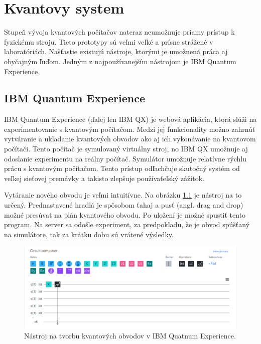 
\chapter{Kvantovy system}

Stupeň vývoja kvantových počítačov nateraz neumožnuje priamy prístup k
fyzickému stroju. Tieto prototypy sú veľmi veľké a prísne strážené v 
laboratóriách. Našťastie existujú nástroje, ktorými je umožnená práca aj 
obyčajným ľuďom. Jedným z najpoužívanejším nástrojom je IBM Quantum Experience. 

\section{IBM Quantum Experience}
IBM Quantum Experience (ďalej len IBM QX) je webová aplikácia, ktorá 
slúži na experimentovanie s kvantovým počítačom. Medzi jej funkcionality 
možno zahrnúť vytváranie a ukladanie kvantových obvodov ako aj ich 
vykonávanie na kvantovom počítači. Tento počítač je symulovaný virtuálny 
stroj, no IBM QX umožnuje aj odoslanie experimentu na reálny počítač. 
Symulátor umožnuje relatívne rýchlu prácu s kvantovým počítačom. Tento
prístup odľachčuje skutočný systém od veľkej sieťovej premávky a takisto 
zlepšuje používaťeľský zážitok.

Vytáranie nového obvodu je veľmi intuitívne. Na obrázku \ref{ibm_qx_composer}
je nástroj na to určený. Prednastavené hradlá je spôsobom ťahaj a pusť (angl.
drag and drop) možné presúvať na plán kvantového obvodu. Po uložení je možné
spustiť tento program. Na server sa odošle experiment, za predpokladu, že
je obvod spúšťaný na simulátore, tak za krátku dobu sú vrátené výsledky.

\begin{figure} 
	\centering 
	\includegraphics[width=1\textwidth]{figures/ibm_qx_composer.png} 
	\caption{Nástroj na tvorbu kvantových obvodov v IBM Quatnum Experience.}
    \label{ibm_qx_composer}
\end{figure}

